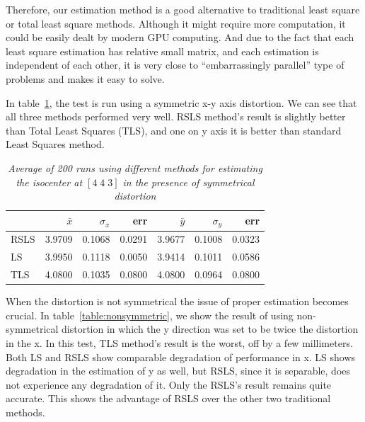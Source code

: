 Therefore, our estimation method is a good alternative to traditional least square or total least square methods. Although it might require more computation, it could be easily dealt by modern GPU computing. And due to the fact that each least square estimation has relative small matrix, and each estimation is independent of each other, it is very close to ``embarrassingly parallel'' type of problems and makes it easy to solve.



In table~\ref{table:symmetric}, the test is run using a symmetric x-y axis distortion. We can see that all three methods performed very well. RSLS method's result is slightly better than Total Least Squares (TLS), and one on y axis it is better than standard Least Squares method.

\begin{table}
  \begin{tabular} {| l | r | r | r | r | r | r |}
    \hline
    & $\bar{x}$ & $\sigma_x$ & err & $\bar{y}$ & $\sigma_y$ & err  \\
    \hline
    RSLS  & 3.9709 & 0.1068  & 0.0291 & 3.9677 & 0.1008 & 0.0323\\
    \hline
    LS & 3.9950 & 0.1118 & 0.0050   & 3.9414 & 0.1011 & 0.0586 \\
    \hline
    TLS  & 4.0800 & 0.1035  & 0.0800   & 4.0800 & 0.0964 & 0.0800 \\
    \hline
  \end{tabular}
  \caption{\emph{Average of 200 runs using different methods for estimating the isocenter at $[4 \; 4 \; 3]$ in the presence of symmetrical distortion}} \label{table:symmetric}
\end{table}


When the distortion is not symmetrical the issue of proper estimation becomes crucial. In table~\ref{table:nonsymmetric}, we show the result of using non-symmetrical distortion in which the y direction was set to be twice the distortion in the x. In this test, TLS method's result is the worst, off by a few millimeters.  Both LS and RSLS show comparable degradation of performance in x.  LS shows degradation in the estimation of y as well, but RSLS, since it is separable, does not experience any degradation of it. Only the RSLS's result remains quite accurate. This shows the advantage of RSLS over the other two traditional methods.


